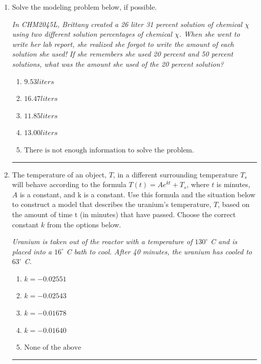 \documentclass[14pt]{extbook}
\newcommand{\litem}[1]{\item#1\hspace*{-1cm}\rule{\textwidth}{0.4pt}}
\begin{document}
\begin{enumerate}
{\begin{enumerate}[label=\Alph*.]
\end{enumerate} }
\litem{
Solve the modeling problem below, if possible.
\begin{center}
    \textit{ In CHM2045L, Brittany created a 26 liter 31 percent solution of chemical $\chi$ using two different solution percentages of chemical $\chi$. When she went to write her lab report, she realized she forgot to write the amount of each solution she used! If she remembers she used 20 percent and 50 percent solutions, what was the amount she used of the 20 percent solution? }
\end{center}
\begin{enumerate}[label=\Alph*.]
\item \( 9.53 liters \)
\item \( 16.47 liters \)
\item \( 11.85 liters \)
\item \( 13.00 liters \)
\item \( \text{There is not enough information to solve the problem.} \)

\end{enumerate} }
\litem{
The temperature of an object, $T$, in a different surrounding temperature $T_s$ will behave according to the formula $T(t) = Ae^{kt} + T_s$, where $t$ is minutes, $A$ is a constant, and k is a constant. Use this formula and the situation below to construct a model that describes the uranium's temperature, $T$, based on the amount of time t (in minutes) that have passed. Choose the correct constant $k$ from the options below.
\begin{center}
    \textit{ Uranium is taken out of the reactor with a temperature of $130^{\circ}$ C and is placed into a $16^{\circ}$ C bath to cool. After 40 minutes, the uranium has cooled to $63^{\circ}$ C. }
\end{center}
\begin{enumerate}[label=\Alph*.]
\item \( k = -0.02551 \)
\item \( k = -0.02543 \)
\item \( k = -0.01678 \)
\item \( k = -0.01640 \)
\item \( \text{None of the above} \)


\end{enumerate}}
\end{enumerate}
\end{document}

